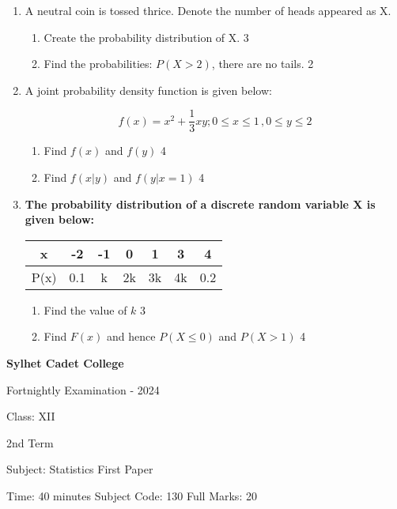 \documentclass[10pt]{article}
\begin{document}
\begin{enumerate}

\item A neutral coin is tossed thrice. Denote the number of heads appeared as X. 

\begin{enumerate}
\item Create the probability distribution of X. \hfill 3
\item Find the probabilities: $P(X>2)$, there are no tails. \hfill 2
\end{enumerate}

\item A joint probability density function is given below:

\[f(x) = x^2+ \frac13 xy; 0\le x \le 1\,, 0\le y \le 2\]

\begin{enumerate}

\item Find $f(x)$ and $f(y)$ \hfill 4
\item Find $f(x|y)$ and $f(y|x=1)$ \hfill 4

\end{enumerate}

\item \textbf{The probability distribution of a discrete random variable X is given below:} 

	  \begin{table}[h]
	  \begin{center}
\begin{tabular}{c|cccccc}
x    & -2   & -1 & 0   & 1 & 3 & 4   \\ \hline
P(x) & 0.1 & k & 2k & 3k & 4k & 0.2
\end{tabular} 
\end{center}	
\end{table}

\begin{enumerate}

\item Find the value of $k$ \hfill 3
\item Find $F(x)$ and hence $P(X \le 0)$ and $P(X > 1)$ \hfill 4

\end{enumerate}

\end{enumerate}

\vspace{0.5in}


\begin{center}
  \bfseries\large
  Sylhet Cadet College

\normalsize
Fortnightly Examination - 2024

  Class: XII
  
  2nd Term

  Subject: Statistics First Paper

  Time: 40 minutes \qquad \qquad  \qquad \qquad Subject Code: 130  \qquad  \qquad \qquad  \qquad Full Marks: 20

\end{center}
\end{document}
